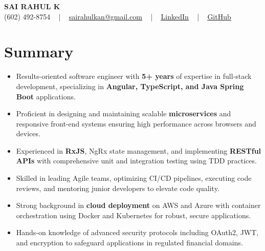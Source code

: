 \documentclass[letterpaper,11pt]{article}
\newcommand{\resumeItem}[1]{
  \item\footnotesize{
    {#1 \vspace{-2pt}}
  }
}
\newcommand{\resumeItemListStart}{\begin{itemize}[leftmargin=*]}
\newcommand{\resumeItemListEnd}{\end{itemize}\vspace{-5pt}}
\begin{document}
\begin{center}
    {\fontsize{14pt}{12pt}\selectfont \textbf{\MakeUppercase{Sai Rahul K}}}\\ \vspace{2pt}
    \fontsize{10pt}{12pt}\selectfont (602) 492-8754 ~ | ~ \href{mailto:sairahulkan@gmail.com}{sairahulkan@gmail.com} ~ | ~
    \href{https://www.linkedin.com/in/rq123/}{\color{blue}\underline{LinkedIn}} ~ | ~
    \href{https://github.com/kanrahuldo}{\color{blue}\underline{GitHub}}~
    \vspace{-8pt}
\end{center}

\section{Summary}
\fontsize{9pt}{10pt}\selectfont
\resumeItemListStart
    \resumeItem{Results-oriented software engineer with \textbf{5+ years} of expertise in full-stack development, specializing in \textbf{Angular, TypeScript, and Java Spring Boot} applications.}
    \resumeItem{Proficient in designing and maintaining scalable \textbf{microservices} and responsive front-end systems ensuring high performance across browsers and devices.}
    \resumeItem{Experienced in \textbf{RxJS}, NgRx state management, and implementing \textbf{RESTful APIs} with comprehensive unit and integration testing using TDD practices.}
    \resumeItem{Skilled in leading Agile teams, optimizing CI/CD pipelines, executing code reviews, and mentoring junior developers to elevate code quality.}
    \resumeItem{Strong background in \textbf{cloud deployment} on AWS and Azure with container orchestration using Docker and Kubernetes for robust, secure applications.}
    \resumeItem{Hands-on knowledge of advanced security protocols including OAuth2, JWT, and encryption to safeguard applications in regulated financial domains.}
\resumeItemListEnd
\vspace{-6pt}
\end{document}
